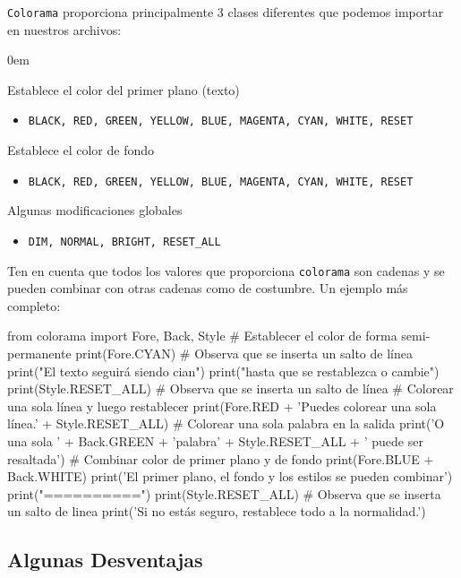 \documentclass[10pt,a4paper]{article}
\begin{document}
\texttt{Colorama} proporciona principalmente 3 clases diferentes que podemos importar en nuestros archivos:

\begin{description}
\itemsep0em 
\item[Fore:] Establece el color del primer plano (texto)
\begin{itemize}
\item \texttt{BLACK, RED, GREEN, YELLOW, BLUE, MAGENTA, CYAN, WHITE, RESET}
\end{itemize}
\item[Back:] Establece el color de fondo
\begin{itemize}
\item \texttt{BLACK, RED, GREEN, YELLOW, BLUE, MAGENTA, CYAN, WHITE, RESET}
\end{itemize}
\item[Style:] Algunas modificaciones globales
\begin{itemize}
\item \texttt{DIM, NORMAL, BRIGHT, RESET\_ALL}
\end{itemize}
\end{description}

\newpage

Ten en cuenta que todos los valores que proporciona \texttt{colorama} son cadenas y se pueden combinar con otras cadenas como de costumbre. Un ejemplo más completo:
\begin{attachedlisting}[example]
from colorama import Fore, Back, Style
# Establecer el color de forma semi-permanente
print(Fore.CYAN) # Observa que se inserta un salto de línea
print("El texto seguirá siendo cian")
print("hasta que se restablezca o cambie")
print(Style.RESET_ALL)  # Observa que se inserta un salto de línea
# Colorear una sola línea y luego restablecer
print(Fore.RED + 'Puedes colorear una sola línea.' + Style.RESET_ALL)
# Colorear una sola palabra en la salida
print('O una sola ' + Back.GREEN + 'palabra' + Style.RESET_ALL + ' puede ser resaltada')
# Combinar color de primer plano y de fondo
print(Fore.BLUE + Back.WHITE)
print('El primer plano, el fondo y los estilos se pueden combinar')
print("==========")
print(Style.RESET_ALL)  # Observa que se inserta un salto de linea
print('Si no estás seguro, restablece todo a la normalidad.')
\end{attachedlisting}

\subsection{Algunas Desventajas}
\end{document}
